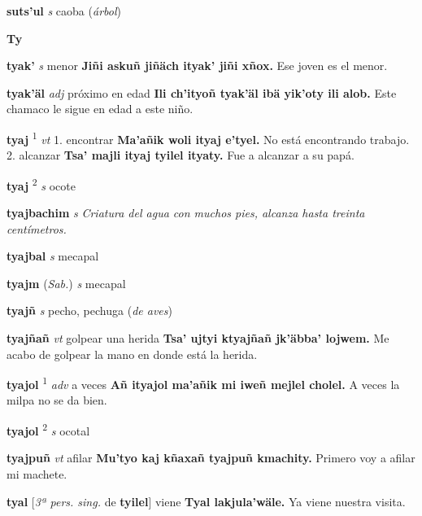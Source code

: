 \documentclass[10pt]{scrbook}
\newcommand{\entry}[1]{\textbf{#1}}
\newcommand{\alphaletter}[1]{\end{multicols}\addsec{#1}\begin{multicols}{2}}
\newcommand{\onedefinition}[1]{#1.}
\newcommand{\defsuperscript}[1]{\textsuperscript{#1}}
\newcommand{\nontranslationdef}[1]{\textit{#1}}
\newcommand{\partofspeech}[1]{\textit{#1}}
\newcommand{\spanishtranslation}[1]{#1}
\newcommand{\clarification}[1]{(\textit{#1})}
\newcommand{\cholexample}[1]{\textbf{#1}}
\newcommand{\exampletranslation}[1]{#1}
\newcommand{\relevantdialect}[1]{(\textit{#1})}
\newcommand{\conjugationtense}[1]{[\textit{#1}}
\newcommand{\conjugationverb}[1]{de \textbf{#1}]}
\begin{document}
\begin{multicols}{2}
\entry{suts'ul}
\partofspeech{s}
\spanishtranslation{caoba}
\clarification{árbol}

\entry{Ty}
\alphaletter{Ty}

\entry{tyak'}
\partofspeech{s}
\spanishtranslation{menor}
\cholexample{Jiñi askuñ jiñäch ityak' jiñi xñox.}
\exampletranslation{Ese joven es el menor.}

\entry{tyak'äl}
\partofspeech{adj}
\spanishtranslation{próximo en edad}
\cholexample{Ili ch'ityoñ tyak'äl ibä yik'oty ili alob.}
\exampletranslation{Este chamaco le sigue en edad a este niño.}

\entry{tyaj}
\defsuperscript{1}
\partofspeech{vt}
\onedefinition{1}
\spanishtranslation{encontrar}
\cholexample{Ma'añik woli ityaj e'tyel.}
\exampletranslation{No está encontrando trabajo.}
\onedefinition{2}
\spanishtranslation{alcanzar}
\cholexample{Tsa' majli ityaj tyilel ityaty.}
\exampletranslation{Fue a alcanzar a su papá.}

\entry{tyaj}
\defsuperscript{2}
\partofspeech{s}
\spanishtranslation{ocote}

\entry{tyajbachim}
\partofspeech{s}
\nontranslationdef{Criatura del agua con muchos pies, alcanza hasta treinta centímetros.}

\entry{tyajbal}
\partofspeech{s}
\spanishtranslation{mecapal}

\entry{tyajm}
\relevantdialect{Sab.}
\partofspeech{s}
\spanishtranslation{mecapal}

\entry{tyajñ}
\partofspeech{s}
\spanishtranslation{pecho, pechuga}
\clarification{de aves}

\entry{tyajñañ}
\partofspeech{vt}
\spanishtranslation{golpear una herida}
\cholexample{Tsa' ujtyi ktyajñañ jk'äbba' lojwem.}
\exampletranslation{Me acabo de golpear la mano en donde está la herida.}

\entry{tyajol}
\defsuperscript{1}
\partofspeech{adv}
\spanishtranslation{a veces}
\cholexample{Añ ityajol ma'añik mi iweñ mejlel cholel.}
\exampletranslation{A veces la milpa no se da bien.}

\entry{tyajol}
\defsuperscript{2}
\partofspeech{s}
\spanishtranslation{ocotal}

\entry{tyajpuñ}
\partofspeech{vt}
\spanishtranslation{afilar}
\cholexample{Mu'tyo kaj kñaxañ tyajpuñ kmachity.}
\exampletranslation{Primero voy a afilar mi machete.}

\entry{tyal}
\conjugationtense{3ª pers. sing.}
\conjugationverb{tyilel}
\spanishtranslation{viene}
\cholexample{Tyal lakjula'wäle.}
\exampletranslation{Ya viene nuestra visita.}


\end{multicols}
\end{document}
